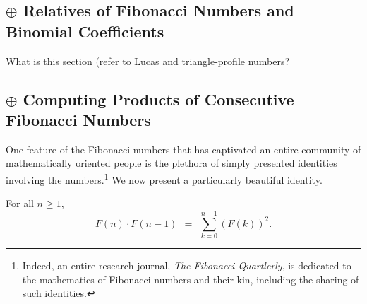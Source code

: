 


\subsection{$\oplus$ Relatives of Fibonacci Numbers and Binomial Coefficients}
\label{sec:Fibo-relatives}

{\Denis What is this section (refer to Lucas and triangle-profile numbers?}


\subsection{$\oplus$ Computing Products of Consecutive Fibonacci Numbers}
\label{sec:product-Fn-Fn+1}

One feature of the Fibonacci numbers that has captivated an entire
community of mathematically oriented people is the plethora of simply
presented identities involving the numbers.\footnote{Indeed, an entire
  research journal, {\it The Fibonacci Quartlerly}, is dedicated to the mathematics of Fibonacci
  numbers and their kin, including the sharing of such identities.}
We now present a particularly beautiful identity.

\begin{prop} 
\label{thm:FiboSumConsecutive}
For all $n \geq 1$,
\begin{equation}
\label{eq:FiboSumConsecutive}
F(n) \cdot F(n-1) \ \ = \ \ \sum_{k=0}^{n-1} (F(k))^2.
\end{equation}
\end{prop}

